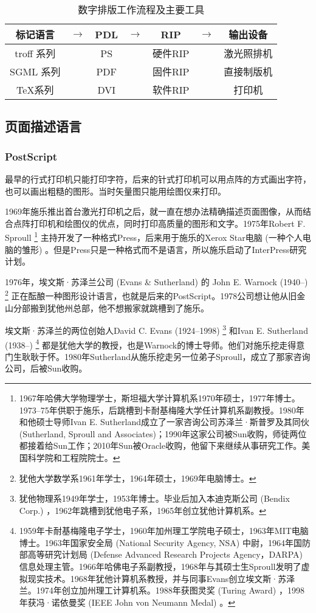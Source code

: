 \begin{table}[!htbp]
\centering
\caption{数字排版工作流程及主要工具}
\label{tab:digital_typesetting}
\begin{tabular}{ccccccc}
    \toprule
    标记语言 & $\to$ & PDL & $\to$ & RIP & $\to$ & 输出设备 \\
    \midrule
    troff 系列 & & PS  & & 硬件RIP & & 激光照排机 \\
    SGML 系列  & & PDF & & 固件RIP & & 直接制版机 \\
    \TeX 系列 & & DVI & & 软件RIP & & 打印机 \\
    \bottomrule
\end{tabular}
\end{table}

\subsection{页面描述语言}

\subsubsection{PostScript}
最早的行式打印机只能打印字符，后来的针式打印机可以用点阵的方式画出字符，也可以画出粗糙的图形。当时矢量图只能用绘图仪来打印。

1969年施乐\indexXerox 推出首台激光打印机之后，就一直在想办法精确描述页面图像，从而结合点阵打印机和绘图仪的优点，同时打印高质量的图形和文字。1975年Robert F. Sproull\indexSproull{} \footnote{1967年哈佛大学物理学士，斯坦福大学计算机系1970年硕士，1977年博士。1973--75年供职于施乐，后跳槽到卡耐基梅隆大学任计算机系副教授。1980年和他硕士导师Ivan E. Sutherland成立了一家咨询公司苏泽兰·斯普罗及其同伙 (Sutherland, Sproull and Associates)；1990年这家公司被Sun收购，师徒两位都接着给Sun工作；2010年Sun被Oracle收购，他留下来继续从事研究工作。美国科学院和工程院院士。} 主持开发了一种格式Press，后来用于施乐的Xerox Star电脑 (一种个人电脑的雏形) 。但是Press只是一种格式而不是语言，所以施乐启动了InterPress研究计划。

1976年，埃文斯·苏泽兰公司 (Evans \& Sutherland)\indexEvansSutherland{} 的 John E. Warnock (1940--)\indexWarnock{} \footnote{犹他大学数学系1961年学士，1964年硕士，1969年电脑博士。} 正在酝酿一种图形设计语言，也就是后来的PostScript。1978公司想让他从旧金山分部搬到犹他州总部，他不想搬家就跳槽到了施乐。

埃文斯·苏泽兰的两位创始人David C. Evans (1924--1998)\indexEvans{} \footnote{犹他物理系1949年学士，1953年博士。毕业后加入本迪克斯公司 (Bendix Corp.) ，1962年跳槽到犹他电子系，1965年创立犹他计算机系。} 和Ivan E. Sutherland (1938--)\indexSutherland{} \footnote{1959年卡耐基梅隆电子学士，1960年加州理工学院电子硕士，1963年MIT电脑博士。1963年国家安全局 (National Security Agency, NSA) 中尉，1964年国防部高等研究计划局 (Defense Advanced Research Projects Agency，DARPA) 信息处理主管。1966年哈佛电子系副教授，1968年与其硕士生Sproull发明了虚拟现实技术。1968年犹他计算机系教授，并与同事Evans创立埃文斯·苏泽兰。1974年创立加州理工计算机系。1988年获图灵奖 (Turing Award) ，1998年获冯·诺依曼奖 (IEEE John von Neumann Medal) 。} 都是犹他大学的教授，也是Warnock的博士导师。他们对施乐挖走得意门生耿耿于怀。1980年Sutherland从施乐挖走另一位弟子Sproull，成立了那家咨询公司，后被Sun收购。

